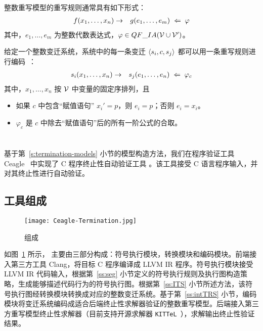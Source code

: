 整数重写模型的重写规则通常具有如下形式：
\begin{eqnarray}
f(x_1,\ldots,x_n) & \rightarrow & g(e_1,\ldots,e_m) \;\Leftarrow\; \varphi \nonumber
\end{eqnarray}
其中，$e_1,\ldots,e_m$ 为整数代数表达式，$\varphi\in QF\_IA(\mathcal{V}\cup\mathcal{V}')$。

给定一个整数变迁系统，系统中的每一条变迁 $\langle s_i, c, s_j \rangle$ 都可以用一条重写规则进行编码~\cite{DBLP:conf/cade/FalkeK09,DBLP:conf/rta/FalkeKS11}：
\begin{eqnarray}
s_i(x_1,\ldots,x_n) & \rightarrow & s_j(e_1,\dots,e_n) \;\Leftarrow\; \varphi_c \nonumber
\end{eqnarray}
其中，$x_1,\ldots,x_n$ 按 $\mathcal{V}$ 中变量的固定序排列，且
\begin{itemize}
\item 如果 $c$ 中包含“赋值语句” $x_i' = p$，则 $e_i = p$；否则 $e_i = x_i$。
\item $\varphi_c$ 是 $c$ 中除去“赋值语句”后的所有一阶公式的合取。
\end{itemize}

\section{\CTerm}
\label{s:ceagle-termination}

基于第~\ref{s:termination-models} 小节的模型构造方法，我们在程序验证工具 Ceagle~\cite{DBLP:conf/models/WangZCGS16} 中实现了 C 程序终止性自动验证工具 \CTerm。该工具接受 C 语言程序输入，并对其终止性进行自动验证。

\subsection{工具组成}

\begin{figure}[ht]
\centering
\texttt{[image: Ceagle-Termination.jpg]}
\caption{\CTerm 组成}
\label{f:Ceagle-Termination}
\end{figure}


如图~\ref{f:Ceagle-Termination} 所示， \CTerm 主要由三部分构成：符号执行模块，转换模块和编码模块。前端接入第三方工具 Clang，将目标 C 程序编译成 LLVM IR 程序。符号执行模块接受 LLVM IR 代码输入，根据第~\ref{ss:seg} 小节定义的符号执行规则及执行图构造策略，生成能够描述代码行为的符号执行图。根据第~\ref{ss:ITS} 小节所述方法，该符号执行图经转换模块转换成对应的整数变迁系统。基于第~\ref{ss:intTRS} 小节，编码模块将变迁系统编码成适合后端终止性求解器验证的整数重写模型。后端接入第三方重写模型终止性求解器（目前支持开源求解器 \verb|KITTeL|~\cite{DBLP:conf/rta/FalkeKS11}），求解输出终止性验证结果。


